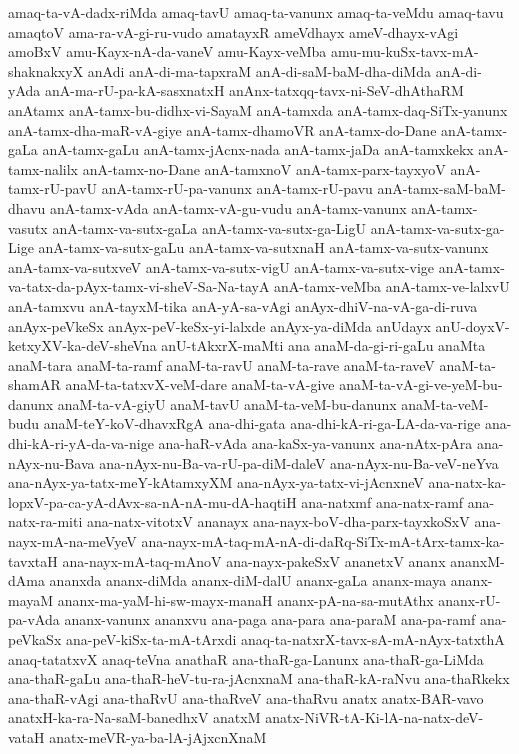 {amaq-ta-vA-dadx-riMda
amaq-tavU
amaq-ta-vanunx
amaq-ta-veMdu
amaq-tavu
amaqtoV
ama-ra-vA-gi-ru-vudo
amatayxR
ameVdhayx
ameV-dhayx-vAgi
amoBxV
amu-Kayx-nA-da-vaneV
amu-Kayx-veMba
amu-mu-kuSx-tavx-mA-shaknakxyX
anAdi
anA-di-ma-tapxraM
anA-di-saM-baM-dha-diMda
anA-di-yAda
anA-ma-rU-pa-kA-sasxnatxH
anAnx-tatxqq-tavx-ni-SeV-dhAthaRM
anAtamx
anA-tamx-bu-didhx-vi-SayaM
anA-tamxda
anA-tamx-daq-SiTx-yanunx
anA-tamx-dha-maR-vA-giye
anA-tamx-dhamoVR
anA-tamx-do-Dane
anA-tamx-gaLa
anA-tamx-gaLu
anA-tamx-jAcnx-nada
anA-tamx-jaDa
anA-tamxkekx
anA-tamx-nalilx
anA-tamx-no-Dane
anA-tamxnoV
anA-tamx-parx-tayxyoV
anA-tamx-rU-pavU
anA-tamx-rU-pa-vanunx
anA-tamx-rU-pavu
anA-tamx-saM-baM-dhavu
anA-tamx-vAda
anA-tamx-vA-gu-vudu
anA-tamx-vanunx
anA-tamx-vasutx
anA-tamx-va-sutx-gaLa
anA-tamx-va-sutx-ga-LigU
anA-tamx-va-sutx-ga-Lige
anA-tamx-va-sutx-gaLu
anA-tamx-va-sutxnaH
anA-tamx-va-sutx-vanunx
anA-tamx-va-sutxveV
anA-tamx-va-sutx-vigU
anA-tamx-va-sutx-vige
anA-tamx-va-tatx-da-pAyx-tamx-vi-sheV-Sa-Na-tayA
anA-tamx-veMba
anA-tamx-ve-lalxvU
anA-tamxvu
anA-tayxM-tika
anA-yA-sa-vAgi
anAyx-dhiV-na-vA-ga-di-ruva
anAyx-peVkeSx
anAyx-peV-keSx-yi-lalxde
anAyx-ya-diMda
anUdayx
anU-doyxV-ketxyXV-ka-deV-sheVna
anU-tAkxrX-maMti
ana
anaM-da-gi-ri-gaLu
anaMta
anaM-tara
anaM-ta-ramf
anaM-ta-ravU
anaM-ta-rave
anaM-ta-raveV
anaM-ta-shamAR
anaM-ta-tatxvX-veM-dare
anaM-ta-vA-give
anaM-ta-vA-gi-ve-yeM-bu-danunx
anaM-ta-vA-giyU
anaM-tavU
anaM-ta-veM-bu-danunx
anaM-ta-veM-budu
anaM-teY-koV-dhavxRgA
ana-dhi-gata
ana-dhi-kA-ri-ga-LA-da-va-rige
ana-dhi-kA-ri-yA-da-va-nige
ana-haR-vAda
ana-kaSx-ya-vanunx
ana-nAtx-pAra
ana-nAyx-nu-Bava
ana-nAyx-nu-Ba-va-rU-pa-diM-daleV
ana-nAyx-nu-Ba-veV-neYva
ana-nAyx-ya-tatx-meY-kAtamxyXM
ana-nAyx-ya-tatx-vi-jAcnxneV
ana-natx-ka-lopxV-pa-ca-yA-dAvx-sa-nA-nA-mu-dA-haqtiH
ana-natxmf
ana-natx-ramf
ana-natx-ra-miti
ana-natx-vitotxV
ananayx
ana-nayx-boV-dha-parx-tayxkoSxV
ana-nayx-mA-na-meVyeV
ana-nayx-mA-taq-mA-nA-di-daRq-SiTx-mA-tArx-tamx-ka-tavxtaH
ana-nayx-mA-taq-mAnoV
ana-nayx-pakeSxV
ananetxV
ananx
ananxM-dAma
ananxda
ananx-diMda
ananx-diM-dalU
ananx-gaLa
ananx-maya
ananx-mayaM
ananx-ma-yaM-hi-sw-mayx-manaH
ananx-pA-na-sa-mutAthx
ananx-rU-pa-vAda
ananx-vanunx
ananxvu
ana-paga
ana-para
ana-paraM
ana-pa-ramf
ana-peVkaSx
ana-peV-kiSx-ta-mA-tArxdi
anaq-ta-natxrX-tavx-sA-mA-nAyx-tatxthA
anaq-tatatxvX
anaq-teVna
anathaR
ana-thaR-ga-Lanunx
ana-thaR-ga-LiMda
ana-thaR-gaLu
ana-thaR-heV-tu-ra-jAcnxnaM
ana-thaR-kA-raNvu
ana-thaRkekx
ana-thaR-vAgi
ana-thaRvU
ana-thaRveV
ana-thaRvu
anatx
anatx-BAR-vavo
anatxH-ka-ra-Na-saM-banedhxV
anatxM
anatx-NiVR-tA-Ki-lA-na-natx-deV-vataH
anatx-meVR-ya-ba-lA-jAjxcnXnaM
}
